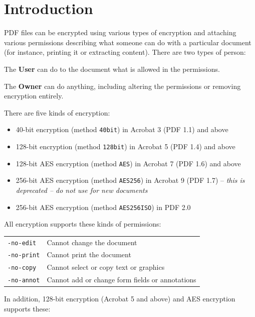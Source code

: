 \documentclass[a4paper,makeidx]{memoir}
\begin{document}
  \section{Introduction}
  PDF files can be encrypted using various types of encryption and attaching
various permissions describing what someone can do with a particular document
(for instance, printing it or extracting content). There are two types of
person:
  \begin{description}
    \item The \textbf{User} can do to the document what is allowed in the permissions.
    \item The \textbf{Owner} can do anything, including altering the permissions or removing encryption entirely.
  \end{description}
  There are five kinds of encryption:
  \begin{itemize}
  \item 40-bit encryption (method \texttt{40bit}) in Acrobat 3 (PDF 1.1) and above
  \item 128-bit encryption (method \texttt{128bit}) in Acrobat 5 (PDF 1.4) and above
  \item 128-bit AES encryption (method \texttt{AES}) in Acrobat 7 (PDF 1.6) and above
  \item 256-bit AES encryption (method \texttt{AES256}) in Acrobat 9 (PDF 1.7) -- \textit{this is deprecated -- do not use for new documents}
  \item 256-bit AES encryption (method \texttt{AES256ISO}) in PDF 2.0
  \end{itemize}

   \vspace{2mm}
   \noindent All encryption supports these kinds of permissions:

   \vspace{2mm}
   \begin{tabular}{ll}
     \texttt{-no-edit} & Cannot change the document\\
     \texttt{-no-print} & Cannot print the document\\
     \texttt{-no-copy} & Cannot select or copy text or graphics\\
     \texttt{-no-annot} & Cannot add or change form fields or annotations\\
   \end{tabular}

   \vspace{2mm}
   \noindent In addition, 128-bit encryption (Acrobat 5 and above) and AES encryption supports these:
\end{document}
